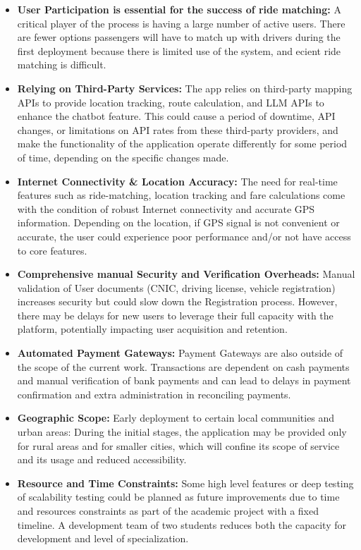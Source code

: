 \begin{itemize}
    \item \textbf{User Participation is essential for the success of ride matching:} A critical player of the process is having a large number of active users. There are fewer options passengers will have to match up with drivers during the first deployment because there is limited use of the system, and ecient ride matching is difficult.

    \item \textbf{Relying on Third-Party Services:} The app relies on third-party mapping APIs to provide location tracking, route calculation, and LLM APIs to enhance the chatbot feature. This could cause a period of downtime, API changes, or limitations on API rates from these third-party providers, and make the functionality of the application operate differently for some period of time, depending on the specific changes made.

    \item \textbf{Internet Connectivity \& Location Accuracy:} The need for real-time features such as ride-matching, location tracking and fare calculations come with the condition of robust Internet connectivity and accurate GPS information. Depending on the location, if GPS signal is not convenient or accurate, the user could experience poor performance and/or not have access to core features.

    \item \textbf{Comprehensive manual Security and Verification Overheads:} Manual validation of User documents (CNIC, driving license, vehicle registration) increases security but could slow down the Registration process. However, there may be delays for new users to leverage their full capacity with the platform, potentially impacting user acquisition and retention.

    \item \textbf{Automated Payment Gateways:} Payment Gateways are also outside of the scope of the current work. Transactions are dependent on cash payments and manual verification of bank payments and can lead to delays in payment confirmation and extra administration in reconciling payments.

    \item \textbf{Geographic Scope:} Early deployment to certain local communities and urban areas: During the initial stages, the application may be provided only for rural areas and for smaller cities, which will confine its scope of service and its usage and reduced accessibility.

    \item \textbf{Resource and Time Constraints:} Some high level features or deep testing of scalability testing could be planned as future improvements due to time and resources constraints as part of the academic project with a fixed timeline. A development team of two students reduces both the capacity for development and level of specialization.
\end{itemize}

